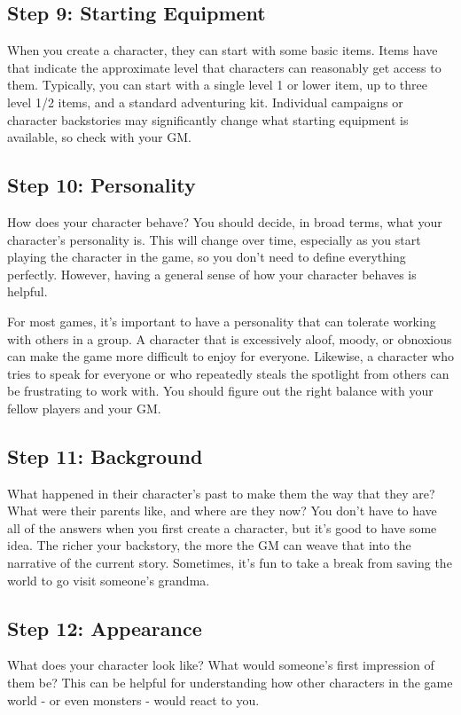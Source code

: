     \subsection{Step 9: Starting Equipment}
        When you create a character, they can start with some basic items.
        Items have  that indicate the approximate level that characters can reasonably get access to them.
        Typically, you can start with a single level 1 or lower item, up to three level 1/2 items, and a standard adventuring kit.
        Individual campaigns or character backstories may significantly change what starting equipment is available, so check with your GM.

    \subsection{Step 10: Personality}

        How does your character behave?
        You should decide, in broad terms, what your character's personality is.
        This will change over time, especially as you start playing the character in the game, so you don't need to define everything perfectly.
        However, having a general sense of how your character behaves is helpful.

        For most games, it's important to have a personality that can tolerate working with others in a group.
        A character that is excessively aloof, moody, or obnoxious can make the game more difficult to enjoy for everyone.
        Likewise, a character who tries to speak for everyone or who repeatedly steals the spotlight from others can be frustrating to work with.
        You should figure out the right balance with your fellow players and your GM.\@

    \subsection{Step 11: Background}
        What happened in their character's past to make them the way that they are?
        What were their parents like, and where are they now?
        You don't have to have all of the answers when you first create a character, but it's good to have some idea.
        The richer your backstory, the more the GM can weave that into the narrative of the current story.
        Sometimes, it's fun to take a break from saving the world to go visit someone's grandma.

    \subsection{Step 12: Appearance}
        What does your character look like?
        What would someone's first impression of them be?
        This can be helpful for understanding how other characters in the game world - or even monsters - would react to you.

